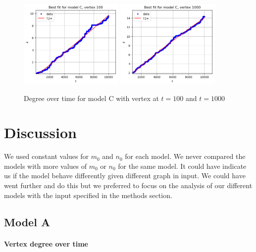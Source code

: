 \documentclass[a4paper]{article}
\begin{document}
%
\begin{figure}[H]
		\centering
		\includegraphics[width=0.45\textwidth]{modelC/best_dt100.png}
		\includegraphics[width=0.45\textwidth]{modelC/best_dt1000.png}
		\caption{Degree over time for model C with vertex at $t=100$ and $t=1000$}
\end{figure}
%
\section{Discussion}

We used constant values for $m_0$ and $n_0$ for each model. We never compared 
the models with more values of $m_0$ or $n_0$ for the same model. It could have 
indicate us if the model behave differently given different graph in input. We 
could have went further and do this but we preferred to focus on the analysis of 
our different models with the input specified in the methods section.

\subsection{Model A}


\paragraph{Vertex degree over time}
\end{document}
